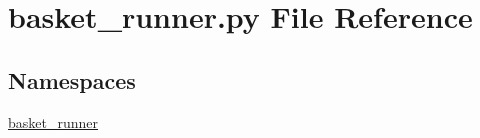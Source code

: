 \section{basket\+\_\+runner.\+py File Reference}
\label{basket__runner_8py}
\subsection*{Namespaces}
\begin{DoxyCompactItemize}
\item 
 \hyperlink{namespacebasket__runner}{basket\+\_\+runner}
\end{DoxyCompactItemize}
